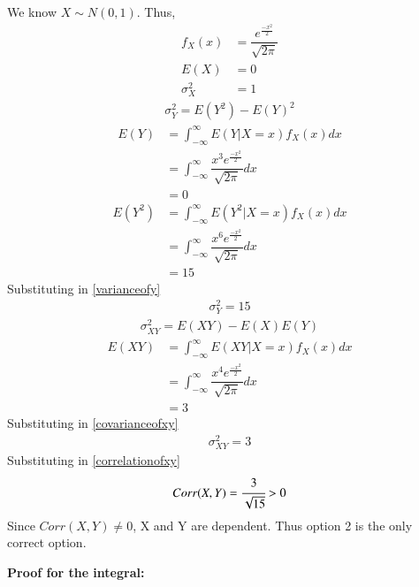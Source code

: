 \documentclass[journal,12pt,twocolumn]{IEEEtran}
\begin{document}
We know $X \sim N(0,1)$. Thus,
\begin{align}
    f_X(x) &= \dfrac{e^{\frac{-x^2}{2}}}{\sqrt{2\pi}}\\
    E(X) &= 0\\
    \sigma_X^2 &= 1
\end{align}
\begin{align}
    \sigma_Y^2 = E(Y^2) - E(Y)^2
    \label{varianceofy}
\end{align}
\begin{align}
    E(Y) &= \int_{-\infty}^{\infty}E(Y|X=x)f_X(x)dx\\
         &= \int_{-\infty}^{\infty}\dfrac{x^3 e^{\frac{-x^2}{2}}}{\sqrt{2\pi}}dx\\
         &= 0
\end{align}
\begin{align}
    E(Y^2) &= \int_{-\infty}^{\infty}E(Y^2|X=x)f_X(x)dx\\
           &= \int_{-\infty}^{\infty}\dfrac{x^6 e^{\frac{-x^2}{2}}}{\sqrt{2\pi}}dx\\
           &= 15
\end{align}
Substituting in \eqref{varianceofy}
\begin{align}
    \sigma_Y^2 = 15
\end{align}
\begin{align}
    \sigma_{XY}^2 = E(XY) - E(X)E(Y)
    \label{covarianceofxy}
\end{align}
\begin{align}
    E(XY) &= \int_{-\infty}^{\infty}E(XY|X=x)f_X(x)dx\\
          &= \int_{-\infty}^{\infty}\dfrac{x^4 e^{\frac{-x^2}{2}}}{\sqrt{2\pi}}dx\\
          &= 3
\end{align}
Substituting in \eqref{covarianceofxy}
\begin{align}
    \sigma_{XY}^2 = 3
\end{align}
Substituting in \eqref{correlationofxy}
\begin{align}
    Corr(X,Y) = \cfrac{3}{\sqrt{15}} > 0
\end{align}
Since $Corr(X,Y) \ne 0$, X and Y are dependent. Thus option 2 is the only correct option.


\textbf{Proof for the integral:}
\end{document}

